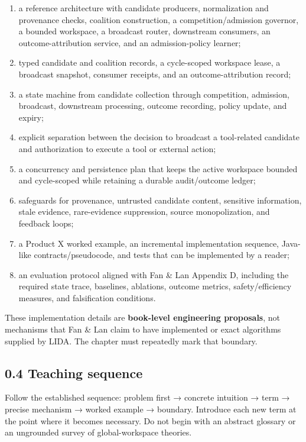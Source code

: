 \begin{enumerate}
\def\labelenumi{\arabic{enumi}.}
\tightlist
\item
  a reference architecture with candidate producers, normalization and provenance checks, coalition construction, a competition/admission governor, a bounded workspace, a broadcast router, downstream consumers, an outcome-attribution service, and an admission-policy learner;
\item
  typed candidate and coalition records, a cycle-scoped workspace lease, a broadcast snapshot, consumer receipts, and an outcome-attribution record;
\item
  a state machine from candidate collection through competition, admission, broadcast, downstream processing, outcome recording, policy update, and expiry;
\item
  explicit separation between the decision to broadcast a tool-related candidate and authorization to execute a tool or external action;
\item
  a concurrency and persistence plan that keeps the active workspace bounded and cycle-scoped while retaining a durable audit/outcome ledger;
\item
  safeguards for provenance, untrusted candidate content, sensitive information, stale evidence, rare-evidence suppression, source monopolization, and feedback loops;
\item
  a Product X worked example, an incremental implementation sequence, Java-like contracts/pseudocode, and tests that can be implemented by a reader;
\item
  an evaluation protocol aligned with Fan \& Lan Appendix D, including the required state trace, baselines, ablations, outcome metrics, safety/efficiency measures, and falsification conditions.
\end{enumerate}

These implementation details are \textbf{book-level engineering proposals}, not mechanisms that Fan \& Lan claim to have implemented or exact algorithms supplied by LIDA. The chapter must repeatedly mark that boundary.

\subsection{0.4 Teaching sequence}\label{04-teaching-sequence}

Follow the established sequence: problem first → concrete intuition → term → precise mechanism → worked example → boundary. Introduce each new term at the point where it becomes necessary. Do not begin with an abstract glossary or an ungrounded survey of global-workspace theories.


